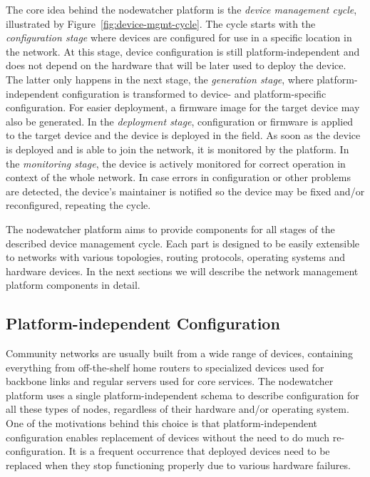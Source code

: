 \documentclass[5p,sort&compress]{elsarticle}
\begin{document}

The core idea behind the nodewatcher platform is the \textit{device management cycle}, illustrated by Figure~\ref{fig:device-mgmt-cycle}.
The cycle starts with the \textit{configuration stage} where devices are configured for use in a specific location in the network.
At this stage, device configuration is still platform-independent and does not depend on the hardware that will be later used to deploy the device.
The latter only happens in the next stage, the \textit{generation stage}, where platform-independent configuration is transformed to device- and platform-specific configuration.
For easier deployment, a firmware image for the target device may also be generated.
In the \textit{deployment stage}, configuration or firmware is applied to the target device and the device is deployed in the field.
As soon as the device is deployed and is able to join the network, it is monitored by the platform.
In the \textit{monitoring stage}, the device is actively monitored for correct operation in context of the whole network.
In case errors in configuration or other problems are detected, the device's maintainer is notified so the device may be fixed and/or reconfigured, repeating the cycle.

The nodewatcher platform aims to provide components for all stages of the described device management cycle.
Each part is designed to be easily extensible to networks with various topologies, routing protocols, operating systems and hardware devices.
In the next sections we will describe the network management platform components in detail.

\subsection{Platform-independent Configuration}

Community networks are usually built from a wide range of devices, containing everything from off-the-shelf home routers to specialized devices used for backbone links and regular servers used for core services.
The nodewatcher platform uses a single platform-independent schema to describe configuration for all these types of nodes, regardless of their hardware and/or operating system.
One of the motivations behind this choice is that platform-independent configuration enables replacement of devices without the need to do much re-configuration.
It is a frequent occurrence that deployed devices need to be replaced when they stop functioning properly due to various hardware failures.
\end{document}
